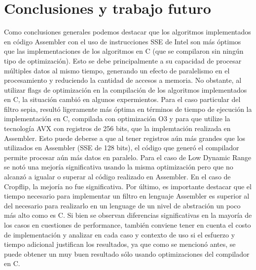 \documentclass[a4paper]{article}
\begin{document}


\section{Conclusiones y trabajo futuro}

Como conclusiones generales podemos destacar que los algoritmos implementados
en código Assembler con el uso de instrucciones SSE de Intel son más óptimos que
las implementaciones de los algoritmos en C (que se compilaron sin ningún
tipo de optimización). Esto se debe principalmente a
su capacidad de procesar múltiples datos al mismo tiempo, generando un efecto
de paralelismo en el procesamiento y reduciendo la cantidad de accesos a memoria.
No obstante, al utilizar flags de optimización en la compilación de los algoritmos
implementados en C, la situación cambió en algunos expermientos. Para el caso particular
del filtro sepia, resultó ligeramente más óptima en términos de tiempo de ejecución
la implementación en C, compilada con optimización O3 y para que utilize la tecnología
AVX con registros de 256 bits, que la implemtación realizada en Assembler. Esto puede deberse
a que al tener registros aún más grandes que los utilizados en Assembler (SSE de 128 bits),
el código que generó el compilador permite procesar aún más datos en paralelo.
Para el caso de Low Dynamic Range se notó una mejoría significativa usando la misma optimización
pero que no alcanzó a igualar o superar al código realizado en Assembler. En el caso de Cropflip, la mejoría no fue significativa.
Por último, es importante destacar que el tiempo necesario para implementar un filtro en lenguaje
Assembler es superior al del necesario para realizarlo en un lenguage de un nivel de abstración
un poco más alto como es C. Si bien se observan diferencias significativas en la mayoría de los
casos en cuestiones de performance, también conviene tener en cuenta el costo de implementación y
analizar en cada caso y contexto de uso si el esfuerzo y tiempo adicional justifican los resultados,
ya que como se mencionó antes, se puede obtener un muy buen resultado sólo usando optimizaciones del compilador en C.
\end{document}
